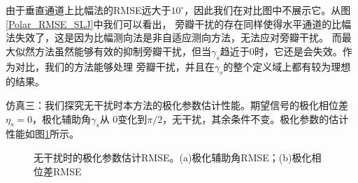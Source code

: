 \documentclass[master]{thesis-uestc}
\begin{document}
由于垂直通道上比幅法的RMSE远大于$10^\circ$，因此我们在对比图中不展示它。从图\ref{Polar_RMSE_SLJ}中我们可以看出，
旁瓣干扰的存在同样使得水平通道的比幅法失效了，这是因为比幅测向法是非自适应测向方法，无法应对旁瓣干扰。
而最大似然方法虽然能够有效的抑制旁瓣干扰，但当$\gamma_s$趋近于0时，它还是会失效。作为对比，我们的方法能够处理
旁瓣干扰，并且在$\gamma_s$的整个定义域上都有较为理想的结果。

仿真三：我们探究无干扰时本方法的极化参数估计性能。期望信号的极化相位差$\eta_s=0$，极化辅助角$\gamma_s$从
$0$变化到$\pi/2$，无干扰，其余条件不变。极化参数的估计性能如图\ref{Polar_args_RMSE}所示。
\begin{figure}[H]
    \caption{无干扰时的极化参数估计RMSE。(a)极化辅助角RMSE；(b)极化相位差RMSE}
    \label{Polar_args_RMSE}
\end{figure}
\end{document}

